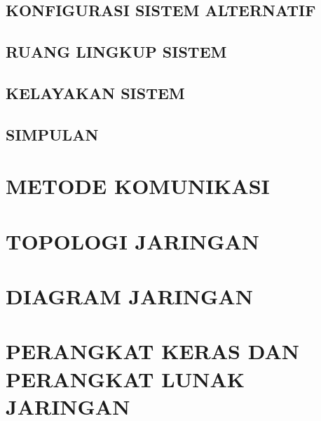 \documentclass[pdftex,12pt, oneside]{article}
\begin{document}
\subsection{KONFIGURASI SISTEM ALTERNATIF}

\subsection{RUANG LINGKUP SISTEM}

\subsection{KELAYAKAN SISTEM}

\subsection{SIMPULAN}

\section{METODE KOMUNIKASI}

\section{TOPOLOGI JARINGAN}

\section{DIAGRAM JARINGAN}

\section{PERANGKAT KERAS DAN PERANGKAT LUNAK JARINGAN}
\end{document}
